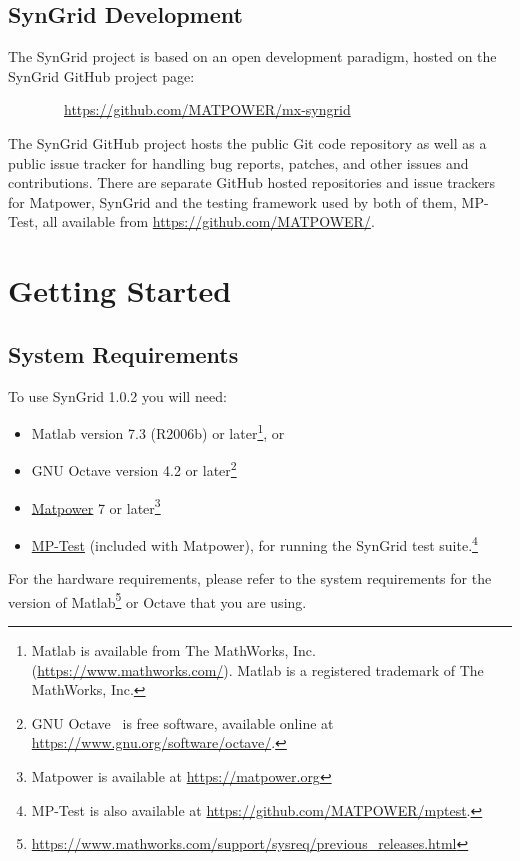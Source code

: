 \documentclass[12pt]{article}
\newcommand{\matlab}[0]{{\sc Matlab}}
\newcommand{\matpower}[0]{{\sc Matpower}}
\newcommand{\matpowerurl}[0]{https://matpower.org}
\newcommand{\matpowerlink}[0]{\href{\matpowerurl}{\matpower{}}}
\newcommand{\mptest}[0]{{MP-Test}}
\newcommand{\mptesturl}[0]{https://github.com/MATPOWER/mptest}
\newcommand{\mptestlink}[0]{\href{\mptesturl}{\mptest{}}}
\newcommand{\syngrid}[0]{{SynGrid}}
\newcommand{\syngridver}[0]{1.0.2}
\newcommand{\syngridurl}[0]{https://github.com/MATPOWER/mx-syngrid}
\numberwithin{equation}{section}
\numberwithin{table}{section}
\numberwithin{figure}{section}
\begin{document}
\subsection{\syngrid{} Development}
\label{sec:development}

The \syngrid{} project is based on an open development paradigm, hosted on the \syngrid{} GitHub project page:

\bigskip

~~~~~~~~\url{\syngridurl}

\bigskip

The \syngrid{} GitHub project hosts the public Git code repository as well as a public issue tracker for handling bug reports, patches, and other issues and contributions. There are separate GitHub hosted repositories and issue trackers for \matpower{}, \syngrid{} and the testing framework used by both of them, \mptest{}, all available from \url{https://github.com/MATPOWER/}.


\section{Getting Started}

\subsection{System Requirements}
\label{sec:sysreq}
To use \syngrid{} \syngridver{} you will need:
\begin{itemize}
\item \matlab{}\textsuperscript{\tiny \textregistered} version 7.3 (R2006b) or later\footnote{\matlab{} is available from The MathWorks, Inc. (\url{https://www.mathworks.com/}). \matlab{} is a registered trademark of The MathWorks, Inc.}, or
\item GNU Octave version 4.2 or later\footnote{GNU Octave~\cite{octave} is free software, available online at \url{https://www.gnu.org/software/octave/}.}
\item \matpowerlink{} 7 or later\footnote{\matpower{} is available at \url{\matpowerurl}}
\item \mptestlink{} (included with \matpower{}), for running the \syngrid{} test suite.\footnote{\mptest{} is also available at \url{\mptesturl}.}
\end{itemize}

For the hardware requirements, please refer to the system requirements for the version of \matlab{}\footnote{\url{https://www.mathworks.com/support/sysreq/previous_releases.html}} or Octave that you are using.
\end{document}
